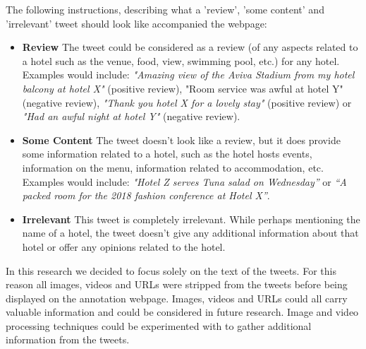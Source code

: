 The following instructions, describing what a 'review', 'some content' and 'irrelevant' tweet should look like accompanied the webpage:
\begin{itemize}
    \item \textbf{Review} \newline
    The tweet could be considered as a review (of any aspects related to a hotel such as the venue, food, view, swimming pool, etc.) for any hotel. Examples would include: \emph{"Amazing view of the Aviva Stadium from my hotel balcony at hotel X"} (positive review), "Room service was awful at hotel Y" (negative review), \emph{"Thank you hotel X for a lovely stay"} (positive review) or \emph{"Had an awful night at hotel Y"} (negative review).
    \item \textbf{Some Content} \newline
    The tweet doesn't look like a review, but it does provide some information related to a hotel, such as the hotel hosts events, information on the menu, information related to accommodation, etc. Examples would include: \emph{"Hotel Z serves Tuna salad on Wednesday”} or \emph{“A packed room for the 2018 fashion conference at Hotel X”}.
    \item \textbf{Irrelevant} \newline
    This tweet is completely irrelevant. While perhaps mentioning the name of a hotel, the tweet doesn't give any additional information about that hotel or offer any opinions related to the hotel.
\end{itemize}

In this research we decided to focus solely on the text of the tweets. For this reason all images, videos and URLs were stripped from the tweets before being displayed on the annotation webpage. Images, videos and URLs could all carry valuable information and could be considered in future research. Image and video processing techniques could be experimented with to gather additional information from the tweets.   

